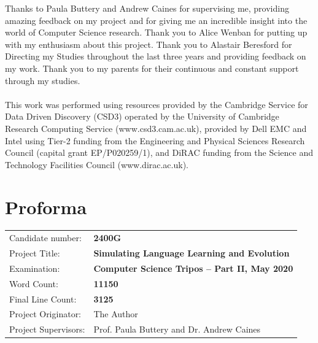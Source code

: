 \documentclass[12pt,a4paper]{report}
\begin{document}
Thanks to Paula Buttery and Andrew Caines for supervising me, providing amazing feedback on my project and for giving me an incredible insight into the world of Computer Science research. Thank you to Alice Wenban for putting up with my enthusiasm about this project. Thank you to Alastair Beresford for Directing my Studies throughout the last three years and providing feedback on my work. Thank you to my parents for their continuous and constant support through my studies.
\\
\\
This work was performed using resources provided by the Cambridge Service for Data Driven Discovery (CSD3) operated by the University of Cambridge Research Computing Service (www.csd3.cam.ac.uk), provided by Dell EMC and Intel using Tier-2 funding from the Engineering and Physical Sciences Research Council (capital grant EP/P020259/1), and DiRAC funding from the Science and Technology Facilities Council (www.dirac.ac.uk).

\chapter*{Proforma}

{\large
\begin{tabular}{ll}
Candidate number:               & \bf 2400G                       \\
Project Title:      & \bf Simulating Language Learning and Evolution \\
Examination:        & \bf Computer Science Tripos -- Part II, May 2020  \\
Word Count:         & \bf 11150\footnotemark[1]  \\
Final Line Count:         & \bf 3125\footnotemark[2]  \\
Project Originator: & The Author                    \\
Project Supervisors:         & Prof. Paula Buttery and Dr. Andrew Caines                  \\ 
\end{tabular}
}
\end{document}
